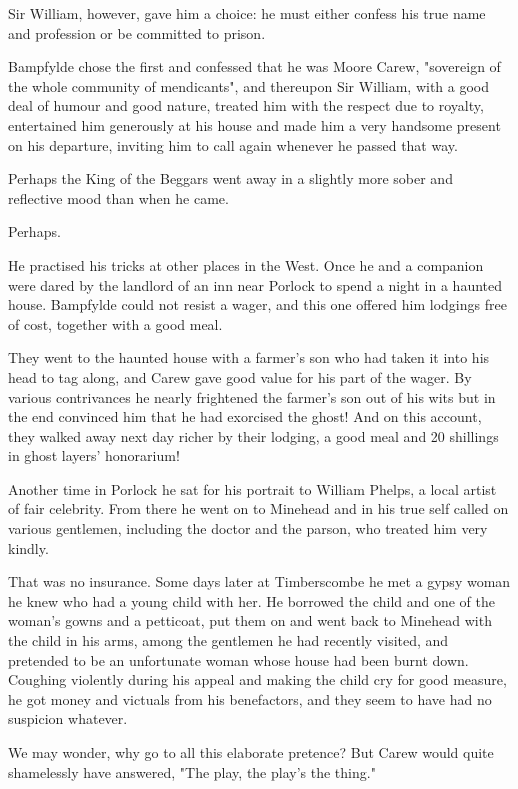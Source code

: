 Sir William, however, gave him a choice: he must either confess his true name and profession or be committed to prison.

Bampfylde chose the first and confessed that he was Moore Carew, "sovereign of the whole community of mendicants", and thereupon Sir William, with a good deal of humour and good nature, treated him with the respect due to royalty, entertained him generously at his house and made him a very handsome present on his departure, inviting him to call again whenever he passed that way.

Perhaps the King of the Beggars went away in a slightly more sober and reflective mood than when he came. 

Perhaps.

\Flourish 

He practised his tricks at other places in the West. Once he and a companion were dared by the landlord of an inn near Porlock to spend a night in a haunted house. Bampfylde could not resist a wager, and this one offered him lodgings free of cost, together with a good meal.

They went to the haunted house with a farmer's son who had taken it into his head to tag along, and Carew gave good value for his part of the wager. By various contrivances he nearly frightened the farmer's son out of his wits but in the end convinced him that he had exorcised the ghost! And on this account, they walked away next day richer by their lodging, a good meal and 20 shillings in ghost layers' honorarium!

Another time in Porlock he sat for his portrait to William Phelps, a local artist of fair celebrity. From there he went on to Minehead and in his true self called on various gentlemen, including the doctor and the parson, who treated him very kindly.

That was no insurance. Some days later at Timberscombe he met a gypsy woman he knew who had a young child with her. He borrowed the child and one of the woman's gowns and a petticoat, put them on and went back to Minehead with the child in his arms, among the gentlemen he had recently visited, and pretended to be an unfortunate woman whose house had been burnt down. Coughing violently during his appeal and making the child cry for good measure, he got money and victuals from his benefactors, and they seem to have had no suspicion whatever.

We may wonder, why go to all this elaborate pretence? But Carew would quite shamelessly have answered, "The play, the play's the thing."

